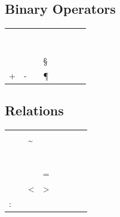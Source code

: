 	\subsection{Binary Operators \showfamily}

	\begin{tabular}{*8l}
	\X\pm           &\X\cap         &\X\diamond             &\X\oplus     \\
	\X\mp           &\X\cup         &\X\bigtriangleup       &\X\ominus    \\
	\X\times        &\X\uplus       &\X\bigtriangledown     &\X\otimes    \\
	\X\div          &\X\sqcap       &\X\triangleleft        &\X\oslash    \\
	\X\ast          &\X\sqcup       &\X\triangleright       &\X\odot      \\
	\X\star         &\X\vee         &\X\lhd                 &\X\bigcirc   \\
	\X\circ         &\X\wedge       &\X\rhd                 &\X\dagger    \\
	\X\bullet       &\X\setminus    &\X\unlhd               &\X\ddagger   \\
	\X\cdot         &\X\wr          &\X\unrhd               &\X\S         \\
	\X+             &\X-            &\X\amalg               &\X\P
	\end{tabular}

	\subsection{Relations \showfamily}

	\begin{tabular}{*8l}
	\X\leq          &\X\geq         &\X\equiv       &\X\models      \\
	\X\prec         &\X\succ        &\X\sim         &\X\perp        \\
	\X\preceq       &\X\succeq      &\X\simeq       &\X\mid         \\
	\X\ll           &\X\gg          &\X\asymp       &\X\parallel    \\
	\X\subset       &\X\supset      &\X\approx      &\X\bowtie      \\
	\X\subseteq     &\X\supseteq    &\X\cong        &\X\Join        \\
	\X\sqsubset     &\X\sqsupset    &\X\neq         &\X\smile       \\
	\X\sqsubseteq   &\X\sqsupseteq  &\X\doteq       &\X\frown       \\
	\X\in           &\X\ni          &\X\propto      &\X=            \\
	\X\vdash        &\X\dashv       &\X<            &\X>            \\
	\X:
	\end{tabular}


